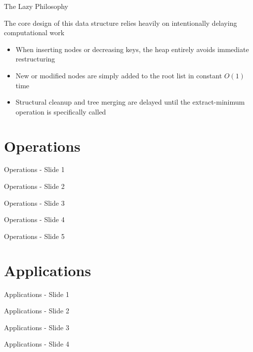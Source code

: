 \documentclass{beamer}
\begin{document}
\begin{frame}[c]{The Lazy Philosophy}

  \vspace{0.6cm}
  
  The core design of this data structure relies heavily on intentionally delaying computational work
  
  \vspace{0.1cm}
  
  \begin{itemize}
    \item When inserting nodes or decreasing keys, the heap entirely avoids immediate restructuring
    \item New or modified nodes are simply added to the root list in constant $O(1)$ time
    \item Structural cleanup and tree merging are delayed until the extract-minimum operation is specifically called
  \end{itemize}
  
  \vspace{0.4cm}
  
  \begin{center}
    
  \end{center}

\end{frame}

\section{Operations}
\begin{frame}{Operations - Slide 1}\end{frame}
\begin{frame}{Operations - Slide 2}\end{frame}
\begin{frame}{Operations - Slide 3}\end{frame}
\begin{frame}{Operations - Slide 4}\end{frame}
\begin{frame}{Operations - Slide 5}\end{frame}


\section{Applications}
\begin{frame}{Applications - Slide 1}\end{frame}
\begin{frame}{Applications - Slide 2}\end{frame}
\begin{frame}{Applications - Slide 3}\end{frame}
\begin{frame}{Applications - Slide 4}\end{frame}
\end{document}
